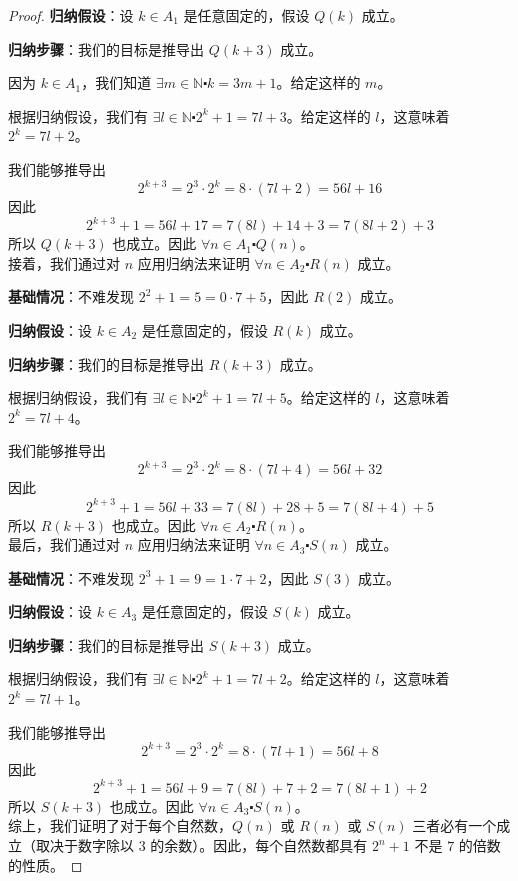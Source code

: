 \begin{proof}
    \textbf{归纳假设}：设 $k \in A_1$ 是任意固定的，假设 $Q(k)$ 成立。

    \textbf{归纳步骤}：我们的目标是推导出 $Q(k+3)$ 成立。

    因为 $k \in A_1$，我们知道 $\exists m \in \mathbb{N} \centerdot k = 3m + 1$。给定这样的 $m$。

    根据归纳假设，我们有 $\exists l \in \mathbb{N} \centerdot 2^k + 1 = 7l + 3$。给定这样的 $l$，这意味着 $2^k = 7l + 2$。

    我们能够推导出
    \[2^{k+3} = 2^3 \cdot 2^k = 8 \cdot (7l + 2) = 56l + 16\]
    因此
    \[2^{k+3} + 1 = 56l + 17 = 7(8l) + 14 + 3 = 7(8l + 2) + 3\]
    所以 $Q(k + 3)$ 也成立。因此 $\forall n \in A_1 \centerdot Q(n)$。\\

    接着，我们通过对 $n$ 应用归纳法来证明 $\forall n \in A_2 \centerdot R(n)$ 成立。

    \textbf{基础情况}：不难发现 $2^2+1=5 = 0 \cdot 7 + 5$，因此 $R(2)$ 成立。

    \textbf{归纳假设}：设 $k \in A_2$ 是任意固定的，假设 $R(k)$ 成立。

    \textbf{归纳步骤}：我们的目标是推导出 $R(k+3)$ 成立。

    根据归纳假设，我们有 $\exists l \in \mathbb{N} \centerdot 2^k + 1 = 7l + 5$。给定这样的 $l$，这意味着 $2^k = 7l + 4$。

    我们能够推导出
    \[2^{k+3} = 2^3 \cdot 2^k = 8 \cdot (7l + 4) = 56l + 32\]
    因此
    \[2^{k+3} + 1 = 56l + 33 = 7(8l) + 28 + 5 = 7(8l + 4) + 5\]
    所以 $R(k + 3)$ 也成立。因此 $\forall n \in A_2 \centerdot R(n)$。\\

    最后，我们通过对 $n$ 应用归纳法来证明 $\forall n \in A_3 \centerdot S(n)$ 成立。

    \textbf{基础情况}：不难发现 $2^3+1=9 = 1 \cdot 7 + 2$，因此 $S(3)$ 成立。

    \textbf{归纳假设}：设 $k \in A_3$ 是任意固定的，假设 $S(k)$ 成立。

    \textbf{归纳步骤}：我们的目标是推导出 $S(k+3)$ 成立。

    根据归纳假设，我们有 $\exists l \in \mathbb{N} \centerdot 2^k + 1 = 7l + 2$。给定这样的 $l$，这意味着 $2^k = 7l + 1$。

    我们能够推导出
    \[2^{k+3} = 2^3 \cdot 2^k = 8 \cdot (7l + 1) = 56l + 8\]
    因此
    \[2^{k+3} + 1 = 56l + 9 = 7(8l) + 7 + 2 = 7(8l + 1) + 2\]
    所以 $S(k + 3)$ 也成立。因此 $\forall n \in A_3 \centerdot S(n)$。\\

    综上，我们证明了对于每个自然数，$Q(n)$ 或 $R(n)$ 或 $S(n)$ 三者必有一个成立（取决于数字除以 $3$ 的余数）。因此，每个自然数都具有 $2^n + 1$ 不是 $7$ 的倍数的性质。
\end{proof}

